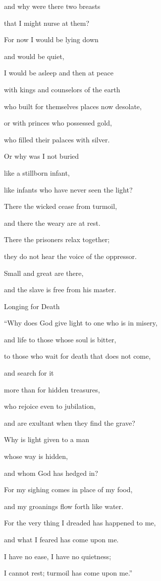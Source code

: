 {\par }{\Q and why
were there two breasts
\par }{\Q that
I might nurse at them?
\par }{\Q {}For
now
I would be lying
down
\par }{\Q and would be quiet,
\par }{\Q I would be asleep
and then
at peace
\par }{\Q {}with
kings
and counselors
of the earth
\par }{\Q who built
for themselves places now desolate,
\par }{\Q {}or
with
princes
who possessed gold,
\par }{\Q who filled
their palaces
with silver.
\par }{\Q {}Or
why was I not
buried
\par }{\Q like a stillborn
infant,

\par }{\Q like infants
who have never
seen
the light?
\par }{\Q {}There
the wicked
cease
from turmoil,
\par }{\Q and there
the weary
are at rest.
\par }{\Q {}There the prisoners
relax
together;
\par }{\Q they do not
hear
the voice
of the oppressor.
\par }{\Q {}Small
and great
are there,
\par }{\Q and the slave
is free
from his master.
\par }{\SH Longing for Death
\par }{\Q {}“Why
does God give
light
to one who is in misery,
\par }{\Q and life
to those
whose soul
is bitter,
\par }{\Q {}to those who wait
for death
that does not
come,
\par }{\Q and search for
it

\par }{\Q more than for hidden treasures,
\par }{\Q {}who rejoice
even to jubilation,
\par }{\Q and are exultant
when
they find
the grave?
\par }{\Q {}Why is light given to a man
\par }{\Q whose
way
is hidden,
\par }{\Q and whom God
has
hedged in?
\par }{\Q {}For
my sighing
comes
in place
of my food,
\par }{\Q and my groanings
flow forth
like water.
\par }{\Q {}For
the very thing
I dreaded
has happened
to me,
\par }{\Q and what I feared
has
come upon me.
\par }{\Q {}I have no
ease,
I have no quietness;
\par }{\Q I cannot
rest;
turmoil
has
come upon me.”


}
